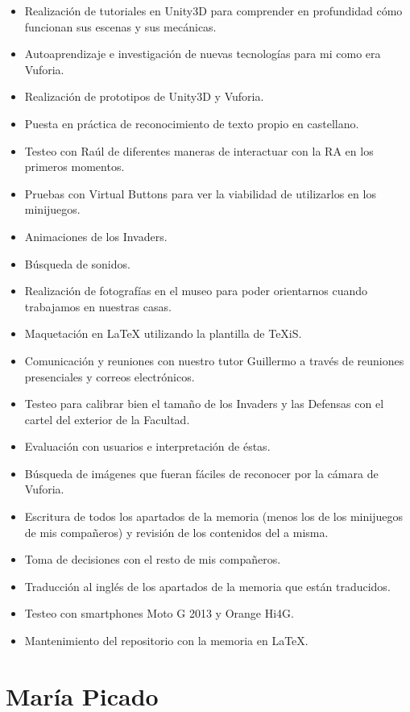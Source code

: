 \begin{itemize}
\item{Realización de tutoriales en Unity3D para comprender en profundidad cómo funcionan sus escenas y sus mecánicas.}
\item{Autoaprendizaje e investigación de nuevas tecnologías para mi como era Vuforia.}
\item{Realización de prototipos de Unity3D y Vuforia.}
\item{Puesta en práctica de reconocimiento de texto propio en castellano.}
\item{Testeo con Raúl de diferentes maneras de interactuar con la RA en los primeros momentos.}
\item{Pruebas con Virtual Buttons para ver la viabilidad de utilizarlos en los minijuegos.}
\item{Animaciones de los Invaders.}
\item{Búsqueda de sonidos.}
\item{Realización de fotografías en el museo para poder orientarnos cuando trabajamos en nuestras casas.}
\item{Maquetación en LaTeX utilizando la plantilla de TeXiS.}
\item{Comunicación y reuniones con nuestro tutor Guillermo a través de reuniones presenciales y correos electrónicos.}
\item{Testeo para calibrar bien el tamaño de los Invaders y las Defensas con el cartel del exterior de la Facultad.}
\item{Evaluación con usuarios e interpretación de éstas.}
\item{Búsqueda de imágenes que fueran fáciles de reconocer por la cámara de Vuforia.}
\item{Escritura de todos los apartados de la memoria (menos los de los minijuegos de mis compañeros) y revisión de los contenidos del a misma.}
\item{Toma de decisiones con el resto de mis compañeros.}
\item{Traducción al inglés de los apartados de la memoria que están traducidos.}
\item{Testeo con smartphones Moto G 2013 y Orange Hi4G.}
\item{Mantenimiento del repositorio con la memoria en LaTeX.}
\end{itemize}

\section{María Picado} %
\label{cap10:sec:maria}

